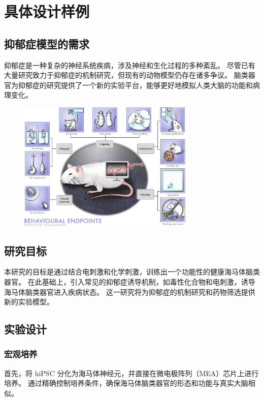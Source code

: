 \chapter{具体设计样例}\label{chap:design}

\section{抑郁症模型的需求}\label{sec:depression-model-requirement}
抑郁症是一种复杂的神经系统疾病，涉及神经和生化过程的多种紊乱。
尽管已有大量研究致力于抑郁症的机制研究，但现有的动物模型仍存在诸多争议。
脑类器官为抑郁症的研究提供了一个新的实验平台，能够更好地模拟人类大脑的功能和病理变化。

\begin{figure}[!htbp]
    \centering
    \includegraphics[width=0.75\textwidth]{Img/depression-model.png}
    \label{fig:depression-model}
\end{figure}

\section{研究目标}\label{sec:research-objective}
本研究的目标是通过结合电刺激和化学刺激，训练出一个功能性的健康海马体脑类器官。
在此基础上，引入常见的抑郁症诱导机制，如毒性化合物和电刺激，诱导海马体脑类器官进入疾病状态。
这一研究将为抑郁症的机制研究和药物筛选提供新的实验模型。


\section{实验设计}\label{sec:experiment-design}
\subsection{宏观培养}\label{subsec:macro-culture}
首先，将 hiPSC 分化为海马体神经元\cite{Wu2024}，并直接在微电极阵列（MEA）芯片上进行培养。
通过精确控制培养条件，确保海马体脑类器官的形态和功能与真实大脑相似。

